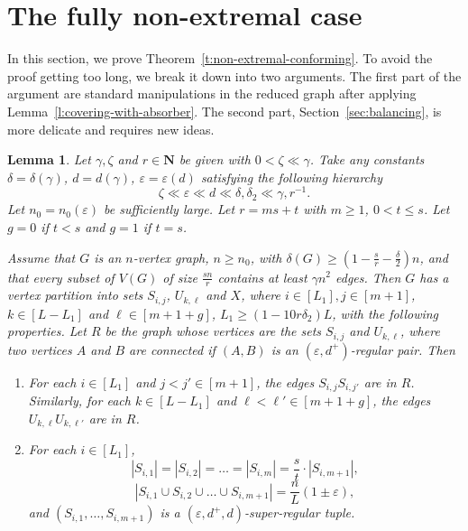 \documentclass[reqno, 12pt]{amsart}
\numberwithin{equation}{section}
\numberwithin{figure}{section}
\theoremstyle{plain}
\newtheorem{lemma}[thm]{Lemma}
\theoremstyle{definition}
\let\eps=\varepsilon
\begin{document}
    \section{The fully non-extremal case}\label{sec:non-extremal} 
        
    In this section, we prove Theorem~\ref{t:non-extremal-conforming}. To avoid the proof getting too long, we break it down into two arguments. The first part of the argument are standard manipulations in the reduced graph after applying Lemma~\ref{l:covering-with-absorber}. The second part, Section~\ref{sec:balancing}, is more delicate and requires new ideas. %
        
    \begin{lemma}\label{l:partition-reduced-graph}
        Let $\gamma, \zeta$ and $r \in \mathbf{N}$ be given with $0 < \zeta \ll \gamma$. Take any constants $\delta=\delta(\gamma)$, $d=d(\gamma)$, $\eps=\eps(d)$ satisfying the following hierarchy \begin{equation}\label{eq:partition-reduced-graph-constants}
            \zeta \ll \eps \ll d \ll \delta,\delta_2 \ll \gamma, r^{-1}. 
        \end{equation}
         Let $n_0=n_0(\eps)$ be sufficiently large. Let $r=ms+t$ with $m\geq 1$, $0< t\leq s$. Let $g = 0$ if $t<s$ and $g=1$ if $t=s$.
            
        Assume that $G$ is an $n$-vertex graph, $n\geq n_0$, with $\delta(G)\geq \left(1-\frac{s}{r}-\frac \delta 2\right)n$, and that every subset of $V(G)$ of size $\frac{sn}{r}$ contains at least $\gamma n^2$ edges. 
        Then $G$ has a vertex partition into sets $S_{i,j}$, $U_{k, \ell}$ and $X$, where $i \in [L_1], j \in [m+1]$, $k\in [L-L_1]$ and $\ell \in [m+1+g]$, $L_1\geq (1-10r\delta_2)L$, with the following properties. Let $R$ be the graph whose vertices are the sets $S_{i,j}$ and $U_{k,\ell}$, where two vertices $A$ and $B$ are connected if $(A, B)$ is an $(\eps, d^+)$-regular pair. Then
	\begin{enumerate}
            
            \item\label{l:part-w-r-f_(i)} For each $i \in [L_1]$ and $j < j' \in [m+1]$, the edges $S_{i,j}S_{i,j'}$ are in $R$. Similarly, for each $k\in [L-L_1]$ and $\ell < \ell' \in [m+1+g]$, the edges $U_{k,\ell}U_{k,\ell'}$ are in $R$. 
			
            \item\label{l:part-w-r-f_(ii)} 
            For each $i \in [L_1]$,
			$$|S_{i,1}|= |S_{i,2} |= \ldots = |S_{i,m}| = \frac {s}{t} \cdot |S_{i,m+1}|,$$
            $$|S_{i,1}\cup S_{i,2}\cup \dots \cup S_{i,m+1}| = \frac{n}{L}(1 \pm \eps),$$
            and $(S_{i,1},\dots, S_{i,m+1})$ is a $(\eps,d^+,d)$-super-regular tuple.


\end{enumerate}
\end{lemma}
\end{document}
